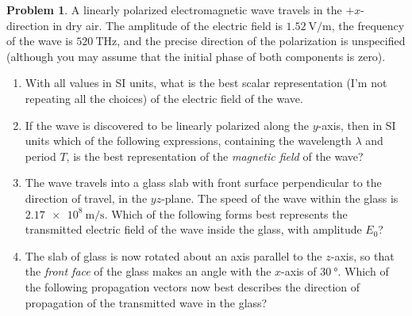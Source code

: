 \documentclass[10pt]{article}
\theoremstyle{definition}
\newtheorem{problem}{Problem}
\begin{document}
\begin{problem}
A linearly polarized electromagnetic wave travels in the $+x$-direction in dry air. The amplitude of the electric field is $\qty{1.52}{\volt\per\meter}$,
the frequency of the wave is $\qty{520}{\tera\hertz}$, and the precise direction of the polarization is unspecified (although you may assume that the initial
phase of both components is zero).
\begin{enumerate}[label=(\roman*)]
  \item With all values in SI units, what is the best scalar representation (I'm not repeating all the choices) of the electric field of the wave.
  \item If the wave is discovered to be linearly polarized along the $y$-axis, then in SI units which of the following expressions, containing 
  the wavelength $\lambda$ and period $T$, is the best representation of the \emph{magnetic field} of the wave?
  \item The wave travels into a glass slab with front surface perpendicular to the direction of travel, in the $yz$-plane. The speed of the wave 
  within the glass is $\qty{2.17e8}{\meter\per\second}$. Which of the following forms best represents the transmitted electric field of the wave 
  inside the glass, with amplitude $E_0$?
  \item The slab of glass is now rotated about an axis parallel to the $z$-axis, so that the \emph{front face} of the glass makes an angle
  with the $x$-axis of $\qty{30}{\degree}$. Which of the following propagation vectors now best describes the direction of propagation of the transmitted
  wave in the glass?
\end{enumerate}
\end{problem}
\end{document}
